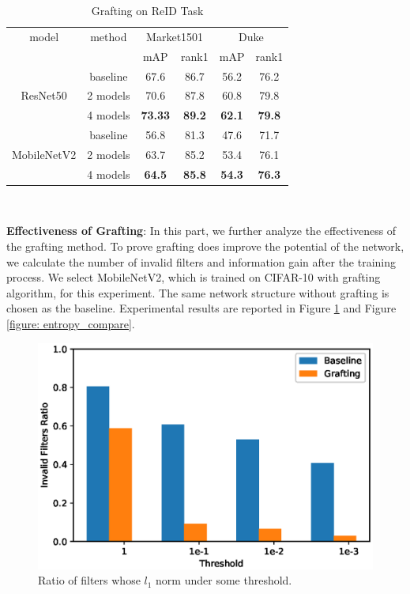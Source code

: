 \documentclass{article}
\begin{document}
\begin{table}[!h]
	\caption{Grafting on ReID Task}
	\begin{center}
		\small
		\begin{tabular}{|c|c|cc|cc|} 
			\hline 
			model &method&\multicolumn{2}{c|}{Market1501} &\multicolumn{2}{c|}{Duke}\\ 
			&&mAP&rank1&mAP&rank1\\ 
			\hline
			&baseline&67.6&86.7&56.2&76.2\\
			ResNet50&2 models&70.6&87.8&60.8&79.8\\
			&4 models&\textbf{73.33}&\textbf{89.2}&\textbf{62.1}&\textbf{79.8}\\
			\hline
			&baseline&56.8&81.3&47.6&71.7\\
			MobileNetV2&2 models&63.7&85.2&53.4&76.1\\
			&4 models&\textbf{64.5}&\textbf{85.8}&\textbf{54.3}&\textbf{76.3}\\
			\hline
		\end{tabular}\\
	\end{center}
	\label{table:ReID}
\end{table}

\textbf{Effectiveness of Grafting}: In this part, we further analyze the effectiveness of the grafting method. To prove grafting does improve the potential of the network, we calculate the number of invalid filters and information gain after the training process. We select MobileNetV2, which is trained on CIFAR-10 with grafting algorithm, for this experiment. The same network structure without grafting is chosen as the baseline. Experimental results are reported in Figure \ref{figure: l1_threshold} and Figure \ref{figure: entropy_compare}. 
\begin{figure}[!h]
	\centering
	\includegraphics[width=15cm,]{fig/l1_threshold.eps}
	\caption{Ratio of filters whose $l_{1}$ norm under some threshold. }
	\label{figure: l1_threshold}
\end{figure}
\end{document}
